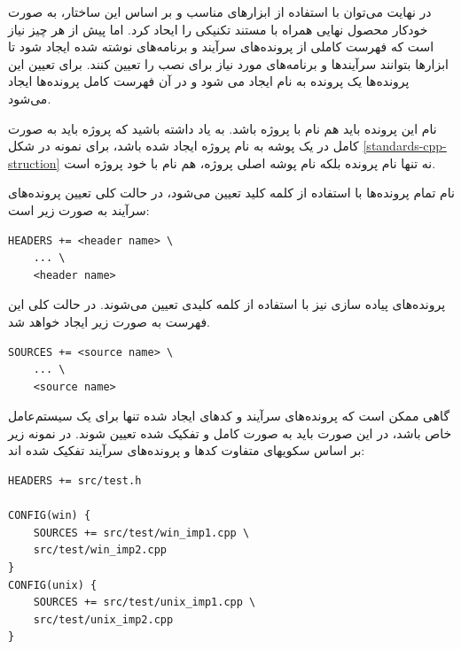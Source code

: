 در نهایت می‌توان با استفاده از ابزارهای مناسب و بر اساس این ساختار، به صورت
خودکار محصول نهایی همراه با مستند تکنیکی را ایحاد کرد. اما پیش از هر چیز نیاز
است که فهرست کاملی از پرونده‌های سرآیند و برنامه‌های نوشته شده ایجاد شود تا
ابزارها بتوانند سرآیندها و برنامه‌های مورد نیاز برای نصب را تعیین کنند. برای
تعیین این پرونده‌ها یک پرونده به نام  ایجاد می شود و در
آن فهرست کامل پرونده‌ها ایجاد می‌شود.

\begin{note}
نام این پرونده باید هم نام با پروژه باشد. به یاد داشته باشید که پروژه باید به
صورت کامل در یک پوشه به نام پروژه ایجاد شده باشد، برای نمونه در شکل
\ref{standards-cpp-struction} نه تنها نام پرونده  بلکه نام پوشه اصلی
پروژه، هم نام با خود پروژه است.
\end{note}

نام تمام پرونده‌ها با استفاده از کلمه کلید  تعیین می‌شود، در حالت
کلی تعیین پرونده‌های سرآیند به صورت زیر است:

\begin{latin}
\lstset{language=C++}  
\begin{lstlisting}[frame=single] 
HEADERS += <header name> \ 
	... \
	<header name>
\end{lstlisting}
\end{latin}

پرونده‌های پیاده سازی نیز با استفاده از کلمه کلیدی  تعیین می‌شوند.
در حالت کلی این فهرست به صورت زیر ایجاد خواهد شد.

\begin{latin}
\lstset{language=C++}  
\begin{lstlisting}[frame=single] 
SOURCES += <source name> \ 
	... \
	<source name>
\end{lstlisting}
\end{latin}

گاهی ممکن است که پرونده‌های سرآیند و کدهای ایجاد شده تنها برای یک سیستم‌عامل خاص
باشد، در این صورت باید به صورت کامل و تفکیک شده تعیین شوند. در نمونه زیر بر اساس
سکویهای متفاوت کدها و پرونده‌های سرآیند تفکیک شده اند:

\begin{latin}
\lstset{language=C++}  
\begin{lstlisting}[frame=single] 
HEADERS += src/test.h

CONFIG(win) { 
    SOURCES += src/test/win_imp1.cpp \
	src/test/win_imp2.cpp
}
CONFIG(unix) { 
    SOURCES += src/test/unix_imp1.cpp \
	src/test/unix_imp2.cpp
}
\end{lstlisting}
\end{latin}

